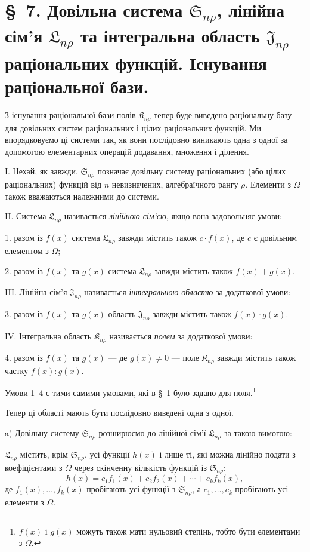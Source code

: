 \documentclass[11pt]{article}
\providecommand{\Kfield}{\mathfrak{K}}
\providecommand{\Ssys}{\mathfrak{S}}
\providecommand{\Jdom}{\mathfrak{J}}
\providecommand{\Lsys}{\mathfrak{L}}
\begin{document}
\section*{\S\ 7. Довільна система $\Ssys_{n\rho}$, лінійна сім'я $\Lsys_{n\rho}$ та інтегральна область $\Jdom_{n\rho}$ раціональних функцій. Існування раціональної бази.}

З існування раціональної бази полів $\Kfield_{n\rho}$ тепер буде виведено раціональну базу для довільних систем раціональних і цілих раціональних функцій. Ми впорядковуємо ці системи так, як вони послідовно виникають одна з одної за допомогою елементарних операцій додавання, множення і ділення.

I. Нехай, як завжди, $\Ssys_{n\rho}$ позначає довільну систему раціональних (або цілих раціональних) функцій від $n$ невизначених, алгебраїчного рангу $\rho$. Елементи з $\Omega$ також вважаються належними до системи.

II. Система $\Lsys_{n\rho}$ називається \emph{лінійною сім'єю}, якщо вона задовольняє умови:

1. разом із $f(x)$ система $\Lsys_{n\rho}$ завжди містить також $c\cdot f(x)$, де $c$ є довільним елементом з $\Omega$;

2. разом із $f(x)$ та $g(x)$ система $\Lsys_{n\rho}$ завжди містить також $f(x)+g(x)$.

III. Лінійна сім'я $\Jdom_{n\rho}$ називається \emph{інтегральною областю} за додаткової умови:

3. разом із $f(x)$ та $g(x)$ область $\Jdom_{n\rho}$ завжди містить також $f(x)\cdot g(x)$.

IV. Інтегральна область $\Kfield_{n\rho}$ називається \emph{полем} за додаткової умови:

4. разом із $f(x)$ та $g(x)$ --- де $g(x)\ne0$ --- поле $\Kfield_{n\rho}$ завжди містить також частку $f(x):g(x)$.

Умови 1--4 є тими самими умовами, які в \S\ 1 було задано для поля.\footnote{$f(x)$ і $g(x)$ можуть також мати нульовий степінь, тобто бути елементами з $\Omega$.}

Тепер ці області мають бути послідовно виведені одна з одної.

a) Довільну систему $\Ssys_{n\rho}$ розширюємо до лінійної сім'ї $\Lsys_{n\rho}$ за такою вимогою:

$\Lsys_{n\rho}$ містить, крім $\Ssys_{n\rho}$, усі функції $h(x)$ і лише ті, які можна лінійно подати з коефіцієнтами з $\Omega$ через скінченну кількість функцій із $\Ssys_{n\rho}$:
\[
  h(x)=c_1f_1(x)+c_2f_2(x)+\cdots+c_kf_k(x),
\]
де $f_1(x),\ldots,f_k(x)$ пробігають усі функції з $\Ssys_{n\rho}$, а $c_1,\ldots,c_k$ пробігають усі елементи з $\Omega$.
\end{document}
